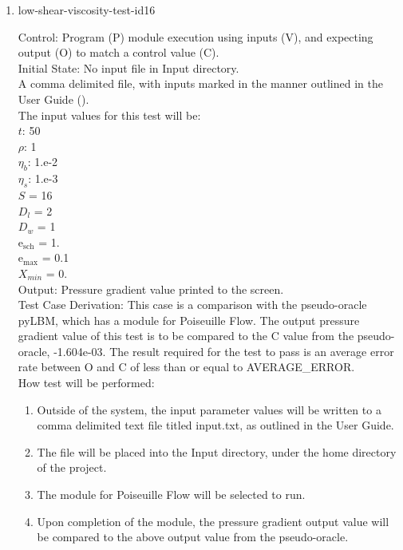 \documentclass[12pt, titlepage]{article}
\begin{document}
\begin{enumerate}
\item{low-shear-viscosity-test-id16\\}

Control: Program (P) module execution using inputs (V), and expecting output (O) to match a control value (C).\\
					
Initial State: No input file in Input directory.\\
					
A comma delimited file, with inputs marked in the manner outlined in the User Guide (\citet{LBM_UserGuide_PM}).\\The input values for this test will be:\\
$t$: 50\\
$\rho$: 1\\
$\eta_b$: 1.e-2\\
$\eta_s$: 1.e-3\\
$S$ = 16\\
$D_{l}$ = 2\\
$D_{w}$ = 1\\
$\mathrm{e_{sch}}$ = 1.\\
$\mathrm{e_{max}}$ = 0.1\\
$X_{min}$ = 0.\\

					
Output: Pressure gradient value printed to the screen. \\ 

Test Case Derivation: This case is a comparison with the pseudo-oracle pyLBM, which has a module for Poiseuille Flow. The output pressure gradient value of this test is to be compared to the C value from the pseudo-oracle, -1.604e-03. The result required for the test to pass is an average error rate between O and C of less than or equal to AVERAGE\_ERROR.\\

					
How test will be performed: 

\begin{enumerate}
\item Outside of the system, the input parameter values will be written to a comma delimited text file titled input.txt, as outlined in the User Guide.
\item The file will be placed into the Input directory, under the home directory of the project.
\item The module for Poiseuille Flow will be selected to run.
\item Upon completion of the module, the pressure gradient output value will be compared to the above output value from the pseudo-oracle.
\end{enumerate}	


\end{enumerate}
\end{document}
